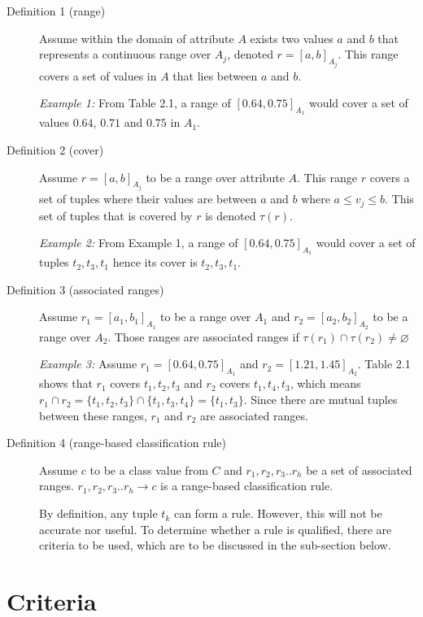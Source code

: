 \begin{description}

\item[Definition 1 (range)]
Assume within the domain of attribute $A$ exists two values $a$ and $b$ that represents a continuous range over $A_j$, denoted $r = [a,b]_{A_j}$. This range covers a set of values in $A$ that lies between $a$ and $b$. 

\textit{Example 1:} From Table 2.1, a range of $[0.64, 0.75]_{A_1}$ would cover a set of values $0.64$, $0.71$ and $0.75$ in $A_1$.

\item[Definition 2 (cover)]
Assume $r = [a,b]_{A_j}$ to be a range over attribute $A$. This range $r$ covers a set of tuples where their values are between $a$ and $b$ where $a \leq v_j \leq b$. This set of tuples that is covered by $r$ is denoted $\tau(r)$. 

\textit{Example 2:} From Example 1, a range of $[0.64, 0.75]_{A_1}$ would cover a set of tuples $t_2, t_3, t_1$ hence its cover is $t_2, t_3, t_1$.

\item[Definition 3 (associated ranges)]
Assume $r_1 = [a_1,b_1]_{A_1}$ to be a range over $A_1$ and $r_2 = [a_2,b_2]_{A_2}$ to be a range over $A_2$. Those ranges are associated ranges if $\tau(r_1) \cap \tau(r_2) \neq \varnothing$ 

\textit{Example 3:} Assume $r_1 = [0.64, 0.75]_{A_1}$ and $r_2 = [1.21, 1.45]_{A_2}$. Table 2.1 shows that $r_1$ covers $t_1, t_2, t_3$ and $r_2$ covers $t_1, t_4, t_3$, which means $r_1 \cap r_2 = \{t_1, t_2, t_3\} \cap \{t_1, t_3, t_4\} = \{t_1, t_3\}$. Since there are mutual tuples between these ranges, $r_1$ and $r_2$ are associated ranges. 

\item[Definition 4 (range-based classification rule)]
Assume $c$ to be a class value from $C$ and $r_1, r_2, r_3..r_h$ be a set of  associated ranges. $r_1, r_2, r_3..r_h \rightarrow c$ is a range-based classification rule. 

By definition, any tuple $t_k$ can form a rule. However, this will not be accurate nor useful. To determine whether a rule is qualified, there are criteria to be used, which are to be discussed in the sub-section below.

\end{description}

\section{Criteria}

